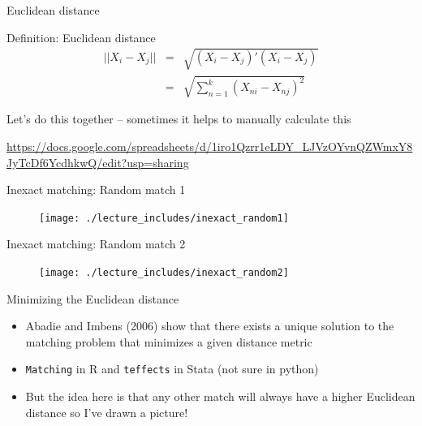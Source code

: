 \documentclass{beamer}
\newcommand*\colvec[1]{\begin{pmatrix}#1\end{pmatrix}}
\begin{document}
	

\begin{frame}{Euclidean distance}
	\begin{block}{Definition: Euclidean distance}
    \vspace*{-2.5mm}
    \begin{eqnarray*}
    ||X_i-X_j|| &=& \sqrt{ (X_i-X_j)'(X_i-X_j) } \\
    &=& \sqrt{ \sum_{n=1}^k (X_{ni} - X_{nj})^2 }
    \end{eqnarray*}
    \vspace*{-2.5mm}
	\end{block}
	
Let's do this together -- sometimes it helps to manually calculate this

\bigskip

\url{https://docs.google.com/spreadsheets/d/1iro1Qzrr1eLDY_LJVzOYvnQZWmxY8JyTcDf6YcdhkwQ/edit?usp=sharing}

	
\end{frame}


\begin{frame}{Inexact matching: Random match 1}

\begin{figure}[!t]\centering
\texttt{[image: ./lecture\_includes/inexact\_random1]}
\end{figure}

\end{frame}


\begin{frame}{Inexact matching: Random match 2}

\begin{figure}[!t]\centering
\texttt{[image: ./lecture\_includes/inexact\_random2]}
\end{figure}

\end{frame}


\begin{frame}{Minimizing the Euclidean distance}

\begin{itemize}
\item Abadie and Imbens (2006) show that there exists a unique solution to the matching problem that minimizes a given distance metric 
\item \texttt{Matching} in R and \texttt{teffects} in Stata (not sure in python)
\item But the idea here is that any other match will always have a higher Euclidean distance so I've drawn a picture!
\end{itemize}

\end{frame}
\end{document}
